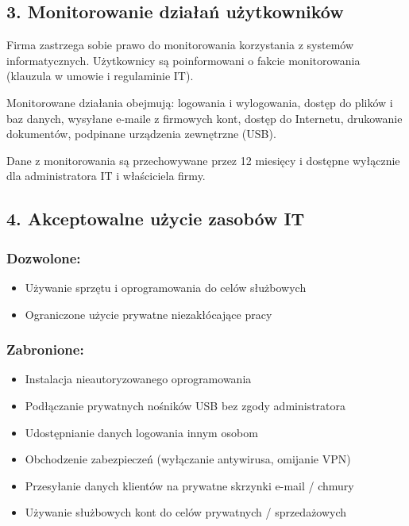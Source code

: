 \documentclass[12pt,a4paper]{article}
\providecommand{\tightlist}{\setlength{\itemsep}{0pt}\setlength{\parskip}{0pt}}
\begin{document}
\subsection{3. Monitorowanie działań
użytkowników}\label{monitorowanie-dziaux142aux144-uux17cytkownikuxf3w}

Firma zastrzega sobie prawo do monitorowania korzystania z systemów
informatycznych. Użytkownicy są poinformowani o fakcie monitorowania
(klauzula w umowie i regulaminie IT).

Monitorowane działania obejmują: logowania i wylogowania, dostęp do
plików i baz danych, wysyłane e-maile z firmowych kont, dostęp do
Internetu, drukowanie dokumentów, podpinane urządzenia zewnętrzne (USB).

Dane z monitorowania są przechowywane przez 12 miesięcy i dostępne
wyłącznie dla administratora IT i właściciela firmy.

\subsection{4. Akceptowalne użycie zasobów
IT}\label{akceptowalne-uux17cycie-zasobuxf3w-it}

\subsubsection{Dozwolone:}\label{dozwolone}

\begin{itemize}
\tightlist
\item
  Używanie sprzętu i oprogramowania do celów służbowych
\item
  Ograniczone użycie prywatne niezakłócające pracy
\end{itemize}

\subsubsection{Zabronione:}\label{zabronione}

\begin{itemize}
\tightlist
\item
  Instalacja nieautoryzowanego oprogramowania
\item
  Podłączanie prywatnych nośników USB bez zgody administratora
\item
  Udostępnianie danych logowania innym osobom
\item
  Obchodzenie zabezpieczeń (wyłączanie antywirusa, omijanie VPN)
\item
  Przesyłanie danych klientów na prywatne skrzynki e-mail / chmury
\item
  Używanie służbowych kont do celów prywatnych / sprzedażowych
\end{itemize}
\end{document}

